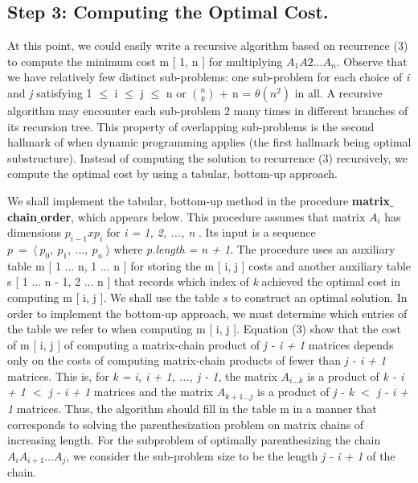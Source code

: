 \subsection{Step 3: Computing the Optimal Cost.}

At this point, we could easily write a recursive algorithm based on recurrence (3) to compute the minimum cost m [ 1, n ] for multiplying $A_{1} A{2} ... A_{n}$. Observe that we have relatively few distinct sub-problems: one sub-problem for each choice of {\itshape i} and {\itshape j} satisfying 1 $\leq$ i $\leq$ j $\leq$ n or ${n \choose k}$ + n = $\theta( n^{2} )$ in all. A recursive algorithm may encounter each sub-problem 2 many times in different branches of its recursion tree. This property of overlapping sub-problems is the second hallmark of when dynamic programming applies (the first hallmark being optimal substructure). Instead of computing the solution to recurrence (3) recursively, we compute the optimal cost by using a tabular, bottom-up approach. \hfill \break

We shall implement the tabular, bottom-up method in the procedure {\bfseries matrix$\_$chain$\_$order}, which appears below. This procedure assumes that matrix $A_{i}$ has dimensions $p_{i-1} x p_{i}$ for {\itshape i = 1, 2, ..., n} . Its input is a sequence $p\ =\ \langle\ p_{0},\ p_{1},\ ...,\ p_{n}\ \rangle$ where {\itshape p.length = n + 1}. The procedure uses an auxiliary table m [ 1 ... n, 1 ... n ] for storing the m [ i, j ] costs and another auxiliary table s [ 1 ... n - 1, 2 ... n ] that records which index of {\itshape k} achieved the optimal cost in computing m [ i, j ]. We shall use the table {\itshape s} to construct an optimal solution. In order to implement the bottom-up approach, we must determine which entries of the table we refer to when computing m [ i, j ]. Equation (3) show that the cost of m [ i, j ] of computing a matrix-chain product of {\itshape j - i + 1} matrices depends only on the costs of computing matrix-chain products of fewer than {\itshape j - i + 1} matrices. This is, for {\itshape k = i, i + 1, ..., j - 1}, the matrix $A_{i ... k}$ is a product of {\itshape k - i + 1 $<$ j - i + 1} matrices and the matrix $A_{k + 1 ... j}$ is a product of {\itshape j - k $<$ j - i + 1} matrices. Thus, the algorithm should fill in the table m in a manner that corresponds to solving the parenthesization problem on matrix chains of increasing length. For the subproblem of optimally parenthesizing the chain $A_{i} A_{i+1} ... A_{j}$, we consider the sub-problem size to be the length {\itshape j - i + 1} of the chain. \hfill \break

